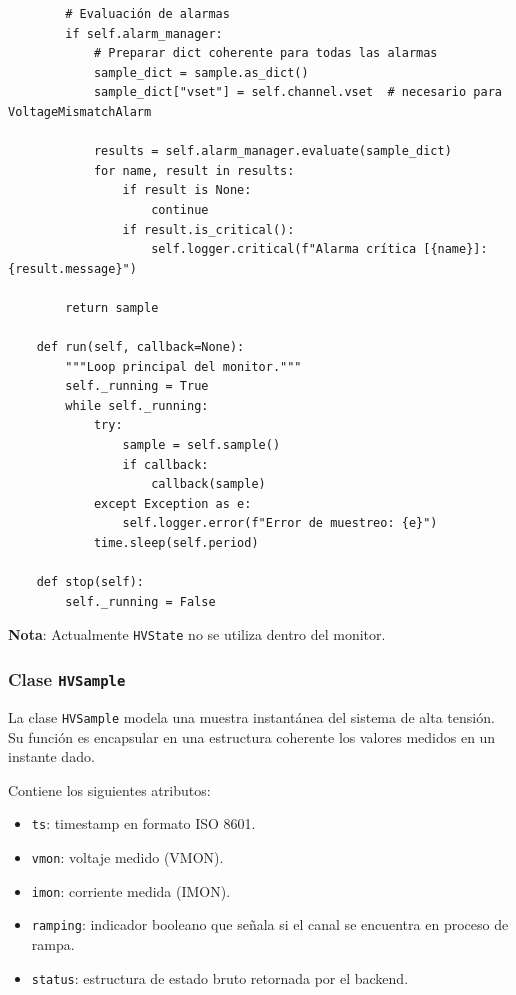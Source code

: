 \documentclass{article}
\begin{document}
\begin{lstlisting}
        # Evaluación de alarmas
        if self.alarm_manager:
            # Preparar dict coherente para todas las alarmas
            sample_dict = sample.as_dict()
            sample_dict["vset"] = self.channel.vset  # necesario para VoltageMismatchAlarm

            results = self.alarm_manager.evaluate(sample_dict)
            for name, result in results:
                if result is None:
                    continue
                if result.is_critical():
                    self.logger.critical(f"Alarma crítica [{name}]: {result.message}")

        return sample

    def run(self, callback=None):
        """Loop principal del monitor."""
        self._running = True
        while self._running:
            try:
                sample = self.sample()
                if callback:
                    callback(sample)
            except Exception as e:
                self.logger.error(f"Error de muestreo: {e}")
            time.sleep(self.period)

    def stop(self):
        self._running = False

\end{lstlisting}

\textbf{Nota}: Actualmente \texttt{HVState} no se utiliza dentro del monitor.

\subsubsection{Clase \texttt{HVSample}}

La clase \texttt{HVSample} modela una muestra instantánea del sistema de alta tensión. 
Su función es encapsular en una estructura coherente los valores medidos en un instante dado.

Contiene los siguientes atributos:

\begin{itemize}
    \item \texttt{ts}: timestamp en formato ISO 8601.
    \item \texttt{vmon}: voltaje medido (VMON).
    \item \texttt{imon}: corriente medida (IMON).
    \item \texttt{ramping}: indicador booleano que señala si el canal se encuentra en proceso de rampa.
    \item \texttt{status}: estructura de estado bruto retornada por el backend.
\end{itemize}
\end{document}
